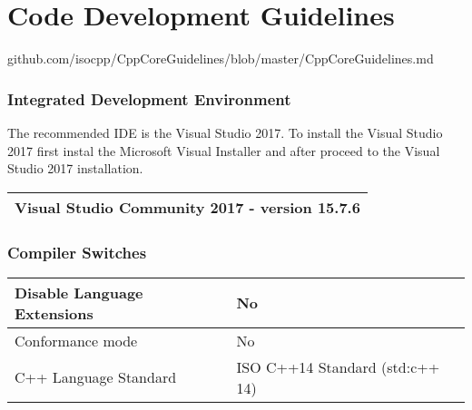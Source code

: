 
\chapter{Code Development Guidelines}

github.com/isocpp/CppCoreGuidelines/blob/master/CppCoreGuidelines.md

\subsection{Integrated Development Environment}

The recommended IDE is the Visual Studio 2017.
To install the Visual Studio 2017 first instal the Microsoft Visual Installer and after proceed to the Visual Studio 2017 installation.

\begin{tabular}{| l |}
\hline
Visual Studio Community 2017 - version 15.7.6 \\
\hline

\end{tabular}


\subsection{Compiler Switches}

\begin{tabular}{| l | l |}
\hline
Disable Language Extensions  & No \\
\hline
Conformance mode  & No \\
\hline
C++ Language Standard  & ISO C++14 Standard (std:c++ 14) \\
\hline
\end{tabular}







